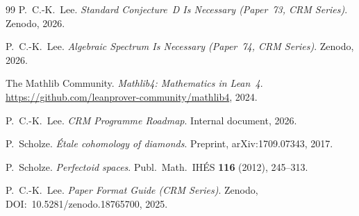 \documentclass[12pt, a4paper]{article}
\theoremstyle{plain}
\theoremstyle{definition}
\theoremstyle{remark}
\begin{document}
\begin{thebibliography}{99}
P.~C.-K.~Lee.
\textit{Standard Conjecture~D Is Necessary
(Paper~73, CRM Series)}.
Zenodo, 2026.

P.~C.-K.~Lee.
\textit{Algebraic Spectrum Is Necessary
(Paper~74, CRM Series)}.
Zenodo, 2026.

The Mathlib Community.
\textit{Mathlib4: Mathematics in Lean~4}.
\url{https://github.com/leanprover-community/mathlib4}, 2024.

P.~C.-K.~Lee.
\textit{CRM Programme Roadmap}.
Internal document, 2026.

P.~Scholze.
\textit{\'Etale cohomology of diamonds}.
Preprint, arXiv:1709.07343, 2017.

P.~Scholze.
\textit{Perfectoid spaces}.
Publ.\ Math.\ IH\'ES \textbf{116} (2012), 245--313.

P.~C.-K.~Lee.
\textit{Paper Format Guide (CRM Series)}.
Zenodo, DOI:~10.5281/zenodo.18765700, 2025.

\end{thebibliography}
\end{document}
